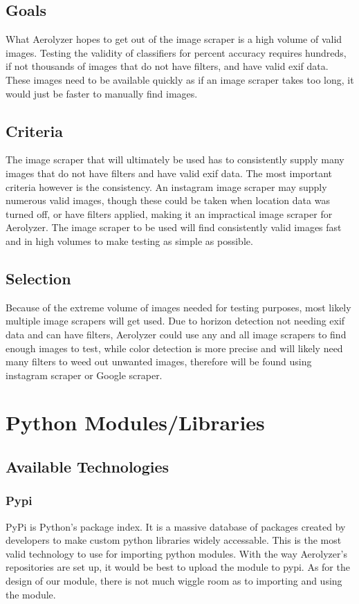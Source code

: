 \documentclass[onecolumn, draftclsnofoot,10pt, compsoc]{IEEEtran}
\begin{document}
\begin{singlespace}
\subsection{Goals}
What Aerolyzer hopes to get out of the image scraper is a high volume of valid images. Testing the validity of classifiers for percent accuracy requires hundreds, if not thousands of images that do not have filters, and have valid exif data. These images need to be available quickly as if an image scraper takes too long, it would just be faster to manually find images.

\subsection{Criteria}
The image scraper that will ultimately be used has to consistently supply many images that do not have filters and have valid exif data. The most important criteria however is the consistency. An instagram image scraper may supply numerous valid images, though these could be taken when location data was turned off, or have filters applied, making it an impractical image scraper for Aerolyzer. The image scraper to be used will find consistently valid images fast and in high volumes to make testing as simple as possible.  


\subsection{Selection}
Because of the extreme volume of images needed for testing purposes, most likely multiple image scrapers will get used. Due to horizon detection not needing exif data and can have filters, Aerolyzer could use any and all image scrapers to find enough images to test, while color detection is more precise and will likely need many filters to weed out unwanted images, therefore will be found using instagram scraper or Google scraper.


\section{Python Modules/Libraries}
\subsection{Available Technologies}
\subsubsection{Pypi}
PyPi is Python's package index. It is a massive database of packages created by developers to make custom python libraries widely accessable. This is the most valid technology to use for importing python modules. With the way Aerolyzer's repositories are set up, it would be best to upload the module to pypi. As for the design of our module, there is not much wiggle room as to importing and using the module. \cite{pypi}


\end{singlespace}
\end{document}
